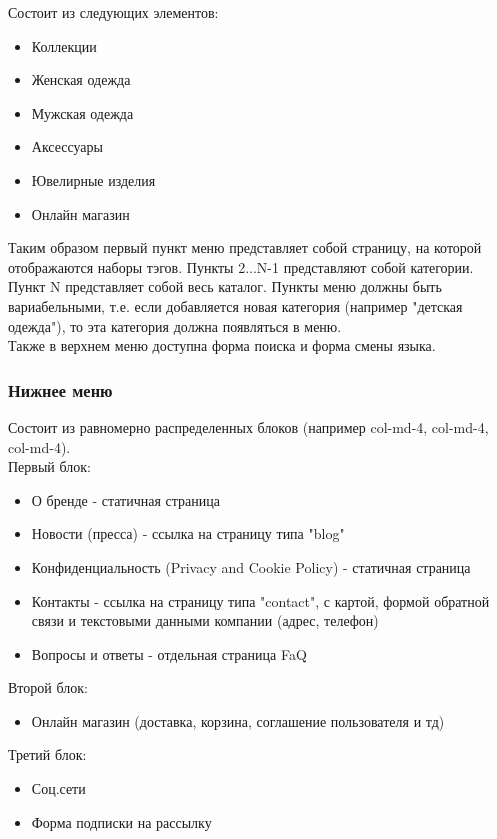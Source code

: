 \documentclass[DIV=calc, paper=a4, fontsize=11pt]{scrartcl} %
\begin{document}
Состоит из следующих элементов:
\begin{itemize}
	\item Коллекции
	\item Женская одежда
	\item Мужская одежда
	\item Аксессуары
	\item Ювелирные изделия 
	\item Онлайн магазин
\end{itemize}

Таким образом первый пункт меню представляет собой страницу, на которой отображаются наборы тэгов. Пункты 2...N-1 представляют собой категории. Пункт N представляет собой весь каталог. Пункты меню должны быть вариабельными, т.е. если добавляется новая категория (например "детская одежда"), то эта категория должна появляться в меню.
\\[0.5cm]
Также в верхнем меню доступна форма поиска и форма смены языка.

\subsubsection{Нижнее меню}
Состоит из равномерно распределенных блоков (например col-md-4, col-md-4, col-md-4). 
\\[0.5cm]
Первый блок:
\begin{itemize}
	\item О бренде - статичная страница
	\item Новости (пресса) - ссылка на страницу типа "blog"
	\item Конфиденциальность (Privacy and Cookie Policy) - статичная страница
	\item Контакты - ссылка на страницу типа "contact", с картой, формой обратной связи и текстовыми данными компании (адрес, телефон)
	\item Вопросы и ответы - отдельная страница FaQ
\end{itemize}

Второй блок:
\begin{itemize}
	\item Онлайн магазин (доставка, корзина, соглашение пользователя и тд)
\end{itemize}

Третий блок:
\begin{itemize}
	\item Соц.сети
	\item Форма подписки на рассылку
\end{itemize}
\end{document}

